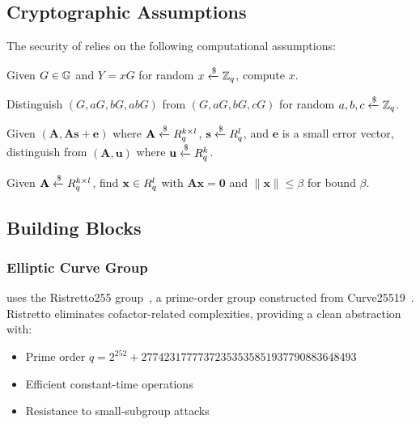 \subsection{Cryptographic Assumptions}

The security of \Botho relies on the following computational assumptions:

\begin{definition}
Given $G \in \mathbb{G}$ and $Y = xG$ for random $x \xleftarrow{\$} \mathbb{Z}_q$, compute $x$.
\end{definition}

\begin{definition}
Distinguish $(G, aG, bG, abG)$ from $(G, aG, bG, cG)$ for random
$a, b, c \xleftarrow{\$} \mathbb{Z}_q$.
\end{definition}

\begin{definition}
Given $(\mathbf{A}, \mathbf{A}\mathbf{s} + \mathbf{e})$ where
$\mathbf{A} \xleftarrow{\$} R_q^{k \times l}$,
$\mathbf{s} \xleftarrow{\$} R_q^l$, and
$\mathbf{e}$ is a small error vector,
distinguish from $(\mathbf{A}, \mathbf{u})$ where
$\mathbf{u} \xleftarrow{\$} R_q^k$.
\end{definition}

\begin{definition}
Given $\mathbf{A} \xleftarrow{\$} R_q^{k \times l}$, find
$\mathbf{x} \in R_q^l$ with $\mathbf{Ax} = \mathbf{0}$ and
$\|\mathbf{x}\| \leq \beta$ for bound $\beta$.
\end{definition}

\subsection{Building Blocks}

\subsubsection{Elliptic Curve Group}

\Botho uses the Ristretto255 group~\cite{ristretto}, a prime-order group
constructed from Curve25519~\cite{curve25519}. Ristretto eliminates cofactor-related
complexities, providing a clean abstraction with:
\begin{itemize}
  \item Prime order $q = 2^{252} + 27742317777372353535851937790883648493$
  \item Efficient constant-time operations
  \item Resistance to small-subgroup attacks
\end{itemize}

